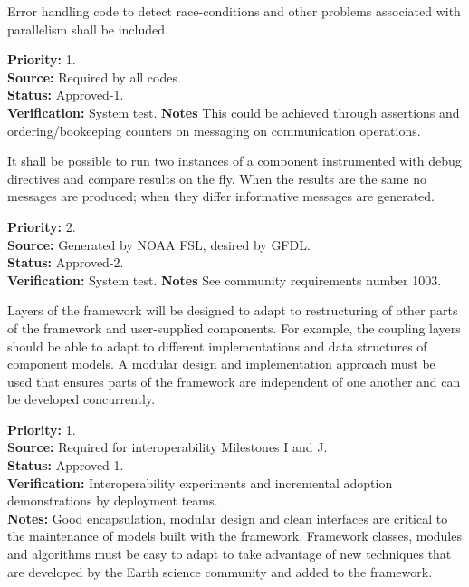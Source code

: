 Error handling code to detect race-conditions and other problems associated 
with parallelism shall be included.
\label{req:gr:error_handling}
\begin{reqlist}
  {\bf Priority:} 1. \\
  {\bf Source:} Required by all codes. \\
  {\bf Status:} Approved-1. \\
  {\bf Verification:} System test.
  {\bf Notes} This could be achieved through assertions and ordering/bookeeping
counters on messaging on communication operations.
\end{reqlist}

It shall be possible to run two instances of a component instrumented 
with debug directives and compare results on the fly.  When 
the results are the same no messages are produced; when they differ
informative messages are generated.
\begin{reqlist}
  {\bf Priority:} 2. \\
  {\bf Source:} Generated by NOAA FSL, desired by GFDL. \\
  {\bf Status:} Approved-2. \\
  {\bf Verification:} System test.
  {\bf Notes} See community requirements number 1003.
\end{reqlist}

Layers of the framework will be designed to adapt to restructuring of
other parts of the framework and user-supplied components.  For
example, the coupling layers should be able to adapt to different
implementations and data structures of component models.
A modular design and implementation approach must be used that ensures
parts of the framework are independent of one another and can be 
developed concurrently.
\begin{reqlist}
{\bf Priority:} 1. \\
{\bf Source:} Required for interoperability Milestones I and J. \\
{\bf Status:} Approved-1. \\
{\bf Verification:} Interoperability experiments and incremental
adoption demonstrations by deployment teams.\\
{\bf Notes:} Good encapsulation, modular design and clean interfaces are critical to the
maintenance of models built with the framework. Framework classes, modules and algorithms must be
easy to adapt to take advantage of new techniques that are developed
by the Earth science community and added to the framework.
\end{reqlist}

